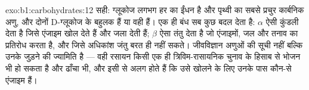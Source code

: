 \begin{solution}{exo:b1:carbohydrates:12}
सही: ग्लूकोज लगभग हर  का ईंधन है और  पृथ्वी का सबसे
प्रचुर कार्बनिक अणु, और दोनों D-ग्लूकोज के बहुलक हैं या वही हैं।
एक ही बंध सब कुछ बदल देता है: $\alpha$ ऐसी कुंडली देता है जिसे एंजाइम
खोल देते हैं और  जला देती हैं; $\beta$ ऐसा तंतु देता है जो
एंजाइमों, जल और तनाव का प्रतिरोध करता है, और जिसे अधिकांश जंतु बरत ही
नहीं सकते। जीवविज्ञान अणुओं की सूची नहीं बल्कि उनके जुड़ने की ज्यामिति है
--- वही रसायन किसी एक ही त्रिविम-रासायनिक चुनाव के हिसाब से भोजन भी हो
सकता है और ढाँचा भी, और  इसी से अलग होते हैं कि उसे खोलने के लिए उनके
पास कौन-से एंजाइम हैं।
\end{solution}

